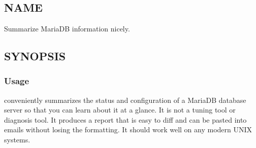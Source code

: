 \documentclass[letterpaper,10pt,english]{sphinxmanual}
\begin{document}
\chapter{}
\label{\detokenize{mariadb-database-summary:mariadb-database-summary}}\label{\detokenize{mariadb-database-summary::doc}}

\section{NAME}
\label{\detokenize{mariadb-database-summary:name}}
\sphinxAtStartPar
{} \sphinxhyphen{} Summarize MariaDB information nicely.


\section{SYNOPSIS}
\label{\detokenize{mariadb-database-summary:synopsis}}

\subsection{Usage}
\label{\detokenize{mariadb-database-summary:usage}}
\begin{sphinxVerbatim}[commandchars=\\\{\}]
 \PYG{p}{[}\PYG{p}{]}
\end{sphinxVerbatim}

\sphinxAtStartPar
{} conveniently summarizes the status and configuration of a
MariaDB database server so that you can learn about it at a glance.  It is not
a tuning tool or diagnosis tool.  It produces a report that is easy to diff
and can be pasted into emails without losing the formatting.  It should work
well on any modern UNIX systems.
\end{document}
